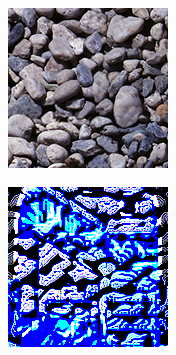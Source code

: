 \begin{figure}[]
\begin{subfigure}{\textwidth}
        \begin{subfigure}{0.19\textwidth}
            \centering
            \includegraphics[width=\textwidth]{images/04-experiment03/staircase_pebble_target.jpg}
            \caption*{}
        \end{subfigure}
        \hfill
        \begin{subfigure}{0.19\textwidth}
            \centering
            \includegraphics[width=\textwidth]{images/04-experiment03/staircase_illum/pebbles/stats_im.jpg}

\end{subfigure}
\end{subfigure}
\end{figure}
